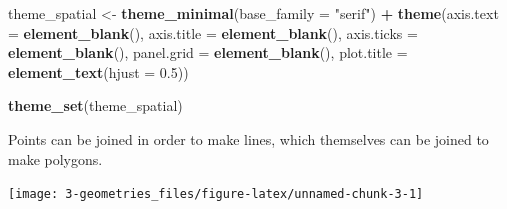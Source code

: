 \documentclass[
]{report}
\newenvironment{Shaded}{\begin{snugshade}}{\end{snugshade}}
\newcommand{\DataTypeTok}[1]{\textcolor[rgb]{0.13,0.29,0.53}{#1}}
\newcommand{\FloatTok}[1]{\textcolor[rgb]{0.00,0.00,0.81}{#1}}
\newcommand{\KeywordTok}[1]{\textcolor[rgb]{0.13,0.29,0.53}{\textbf{#1}}}
\newcommand{\NormalTok}[1]{#1}
\newcommand{\OperatorTok}[1]{\textcolor[rgb]{0.81,0.36,0.00}{\textbf{#1}}}
\newcommand{\StringTok}[1]{\textcolor[rgb]{0.31,0.60,0.02}{#1}}
\begin{document}
\begin{Shaded}
\begin{Highlighting}[]
\NormalTok{theme\_spatial \textless{}{-}}\StringTok{ }\KeywordTok{theme\_minimal}\NormalTok{(}\DataTypeTok{base\_family =} \StringTok{"serif"}\NormalTok{) }\OperatorTok{+}
\StringTok{  }\KeywordTok{theme}\NormalTok{(}\DataTypeTok{axis.text =} \KeywordTok{element\_blank}\NormalTok{(), }\DataTypeTok{axis.title =} \KeywordTok{element\_blank}\NormalTok{(),}
        \DataTypeTok{axis.ticks =} \KeywordTok{element\_blank}\NormalTok{(), }\DataTypeTok{panel.grid =} \KeywordTok{element\_blank}\NormalTok{(),}
        \DataTypeTok{plot.title =} \KeywordTok{element\_text}\NormalTok{(}\DataTypeTok{hjust =} \FloatTok{0.5}\NormalTok{))}

\KeywordTok{theme\_set}\NormalTok{(theme\_spatial)}
\end{Highlighting}
\end{Shaded}

Points can be joined in order to make lines, which themselves can be joined to make polygons.

\begin{center}\texttt{[image: 3-geometries\_files/figure-latex/unnamed-chunk-3-1]} \end{center}
\end{document}
